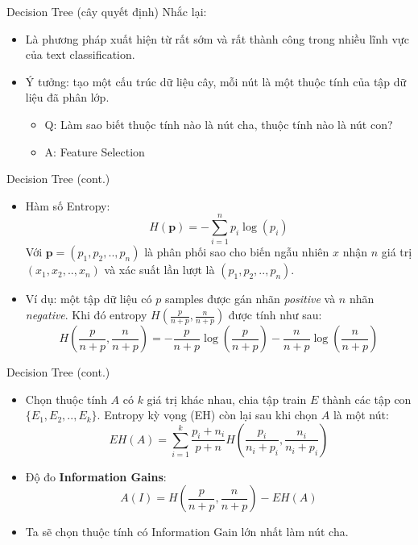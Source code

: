 \documentclass[aspectratio=169,xcolor=dvipsnames]{beamer}
\begin{document}
\begin{frame}{Decision Tree (cây quyết định)}
Nhắc lại:
\begin{itemize}
\item Là phương pháp xuất hiện từ rất sớm và rất thành công trong nhiều lĩnh vực của text classification.
\item Ý tưởng: tạo một cấu trúc dữ liệu cây, mỗi nút là một thuộc tính của tập dữ liệu đã phân lớp.
\begin{itemize}
    \item Q: Làm sao biết thuộc tính nào là nút cha, thuộc tính nào là nút con?
    \item A: Feature Selection
\end{itemize}
\end{itemize}
\end{frame}

\begin{frame}{Decision Tree (cont.)}
\begin{itemize}
\item Hàm số Entropy:
$$
H(\textbf{p}) = -\sum_{i = 1}^n p_i\log(p_i)
$$
Với $\textbf{p} = (p_1, p_2, .., p_n)$ là phân phối sao cho biến ngẫu nhiên $x$ nhận $n$ giá trị $(x_1, x_2, .., x_n)$ và xác suất lần lượt là $(p_1, p_2, .., p_n)$.

\item Ví dụ: một tập dữ liệu có $p$ samples được gán nhãn \textit{positive} và $n$ nhãn \textit{negative}. Khi đó entropy $H(\frac{p}{n + p}, \frac{n}{n + p})$ được tính như sau:
$$
H\left(\frac{p}{n + p}, \frac{n}{n + p}\right) = - \frac{p}{n + p}\log\left(\frac{p}{n + p}\right) - \frac{n}{n + p}\log\left(\frac{n}{n + p}\right)
$$
\end{itemize}
\end{frame}

\begin{frame}{Decision Tree (cont.)}
\begin{itemize}
\item Chọn thuộc tính $A$ có $k$ giá trị khác nhau, chia tập train $E$ thành các tập con $\{E_1, E_2, .., E_k\}$. Entropy kỳ vọng (EH) còn lại sau khi chọn $A$ là một nút:
$$
EH(A) = \sum_{i = 1}^{k} \frac{p_i + n_i}{p + n} H\left(\frac{p_i}{n_i + p_i}, \frac{n_i}{n_i + p_i}\right)
$$
\item Độ đo \textbf{Information Gains}:
$$
A(I) = H\left(\frac{p}{n + p}, \frac{n}{n + p}\right) - EH(A)
$$
\item Ta sẽ chọn thuộc tính có Information Gain lớn nhất làm nút cha.
\end{itemize}
\end{frame}
\end{document}

